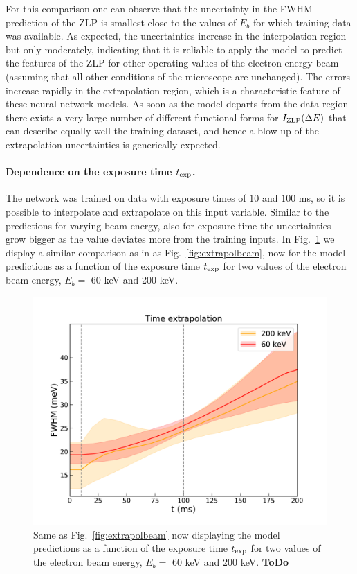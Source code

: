 For this comparison one can observe that the uncertainty in the FWHM prediction of the ZLP is smallest 
close to the values of $E_b$ for which training data was available. 
%
As expected, the uncertainties increase in the interpolation region but only moderately, indicating that
it is reliable to apply the model to predict the features of the ZLP for other operating values of the electron
energy beam (assuming that all other conditions of the microscope are unchanged).
%
The errors increase rapidly in the extrapolation region, which is a characteristic feature of
these neural network models.
%
As soon as the model departs from the data region there exists a very large
number of different functional forms for $I_{\rm ZLP}(\Delta E)$ that can describe equally well
the training dataset, and hence a blow up of the extrapolation uncertainties is generically expected.

\paragraph{Dependence on the exposure time $t_{\rm exp}$.}
%
The network was trained on data with exposure times of $10$ and $100$ ms, so it is possible to interpolate and extrapolate on this input variable. Similar to the predictions for varying beam energy, also for exposure time the uncertainties grow bigger as the value deviates more from the training inputs.
%
In Fig.~\ref{fig:extrapotime} we display a similar comparison as in
as Fig.~\ref{fig:extrapolbeam}, now for the model
      predictions as a function of the exposure time $t_{\rm exp}$
for two values of the electron beam energy, $E_b=$ 60 keV and 200 keV.

\begin{figure}[t]
  \centering
    \includegraphics[width=120mm]{plots/Time_extrapolation.pdf}
    \caption{Same as Fig.~\ref{fig:extrapolbeam} now displaying the model
      predictions as a function of the exposure time $t_{\rm exp}$
for two values of the electron beam energy, $E_b=$ 60 keV and 200 keV.
      {\bf ToDo}}
    \label{fig:extrapotime}
\end{figure}
